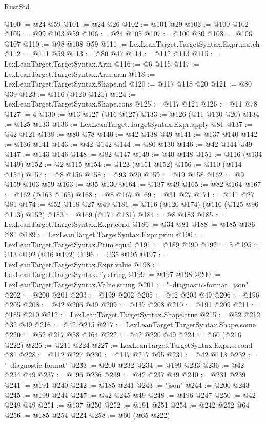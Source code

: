 \begin{lexlean}{RustStd}
\begin{coremodule}
{\begin{coremodule}
{{{{{{{{{{@100 := @24 @59
@101 := @24 @26
@102 := @101 @29
@103 := @100 @102
@105 := @99 @103 @59
@106 := @24 @105
@107 := @100 @30
@108 := @106 @107
@110 := @98 @108 @59
@111 := LexLeanTarget.TargetSyntax.Expr.match
@112 := @111 @59
@113 := @80 @47
@114 := @112 @113
@115 := LexLeanTarget.TargetSyntax.Arm
@116 := @6 @115
@117 := LexLeanTarget.TargetSyntax.Arm.arm
@118 := LexLeanTarget.TargetSyntax.Shape.nil
@120 := @117 @118 @20
@121 := @80 @39
@123 := @116 (@120 @121)
@124 := LexLeanTarget.TargetSyntax.Shape.cons
@125 := @117 @124
@126 := @11 @78
@127 := 4
@130 := @13 @127 (@16 @127)
@133 := @126 (@11 @130 @20)
@134 := @125 @133
@136 := LexLeanTarget.TargetSyntax.Expr.apply @81
@137 := @42 @121
@138 := @80 @78
@140 := @42 @138 @49
@141 := @137 @140
@142 := @136 @141
@143 := @42 @142
@144 := @80 @130
@146 := @42 @144 @49
@147 := @143 @146
@148 := @82 @147
@149 := @40 @148
@151 := @116 (@134 @149)
@152 := @2 @115
@154 := @123 (@151 @152)
@156 := @110 (@114 @154)
@157 := @8 @156
@158 := @93 @20
@159 := @19 @158
@162 := @9 @159 @103 @59
@163 := @35 @130
@164 := @137 @49
@165 := @82 @164
@167 := @162 (@163 @165)
@168 := @8 @167
@169 := @31 @27
@171 := @111 @27 @81
@174 := @52 @118 @27 @49
@181 := @116 (@120 @174) (@116 (@125 @96 @113) @152)
@183 := @169 (@171 @181)
@184 := @8 @183
@185 := LexLeanTarget.TargetSyntax.Expr.cond
@186 := @34 @81
@188 := @185 @186 @81
@189 := LexLeanTarget.TargetSyntax.Expr.prim
@190 := LexLeanTarget.TargetSyntax.Prim.equal
@191 := @189 @190
@192 := 5
@195 := @13 @192 (@16 @192)
@196 := @35 @195
@197 := LexLeanTarget.TargetSyntax.Expr.value
@198 := LexLeanTarget.TargetSyntax.Ty.string
@199 := @197 @198
@200 := LexLeanTarget.TargetSyntax.Value.string
@201 := "--diagnostic-format=json"
@202 := @200 @201
@203 := @199 @202
@205 := @42 @203 @49
@206 := @196 @205
@208 := @42 @206 @49
@209 := @137 @208
@210 := @191 @209
@211 := @185 @210
@212 := LexLeanTarget.TargetSyntax.Shape.true
@215 := @52 @212 @32 @49
@216 := @42 @215
@217 := LexLeanTarget.TargetSyntax.Shape.some
@220 := @52 @217 @58 @164
@222 := @42 @220 @49
@224 := @60 (@216 @222)
@225 := @211 @224
@227 := LexLeanTarget.TargetSyntax.Expr.second @81
@228 := @112 @227
@230 := @117 @217 @95
@231 := @42 @113
@232 := "--diagnostic-format"
@233 := @200 @232
@234 := @199 @233
@236 := @42 @234 @49
@237 := @196 @236
@239 := @42 @237 @49
@240 := @231 @239
@241 := @191 @240
@242 := @185 @241
@243 := "json"
@244 := @200 @243
@245 := @199 @244
@247 := @42 @245 @49
@248 := @196 @247
@250 := @42 @248 @49
@251 := @137 @250
@252 := @191 @251
@254 := @242 @252 @64
@256 := @185 @254 @224
@258 := @60 (@65 @222)
}}}}}}}}}}
\end{coremodule}}
\end{coremodule}
\end{lexlean}
